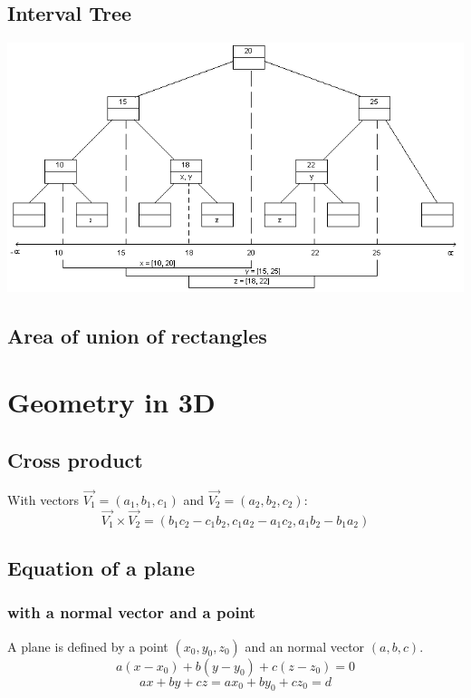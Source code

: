 \subsection{Interval Tree}

\includegraphics[scale=0.38]{Geometrie/it.png}



\subsection{Area of union of rectangles}



%

\section{Geometry in 3D}
\subsection{Cross product}
With vectors $\vec{V_1}=(a_1, b_1, c_1)$ and $\vec{V_2}=(a_2, b_2, c_2)$:
$$\vec{V_1}\times\vec{V_2}=(b_1c_2-c_1b_2, c_1a_2-a_1c_2, a_1b_2-b_1a_2)$$
\subsection{Equation of a plane}
\subsubsection{with a normal vector and a point}
A plane is defined by a point $(x_0, y_0, z_0)$ and an normal vector $(a, b, c)$.
$$a(x-x_0)+b(y-y_0)+c(z-z_0)=0$$
$$ax+by+cz=ax_0+by_0+cz_0=d$$
